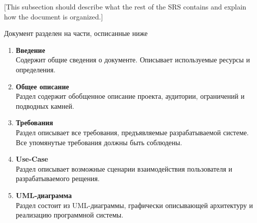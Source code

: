 [This subsection should describe what the rest 
of the SRS contains and explain how the document 
is organized.]

Документ разделен на части, осписанные ниже
\begin{enumerate}
    \item \textbf{Введение}\\
    Содержит общие сведения о документе. Описывает используемые ресурсы и определения.
    \item \textbf{Общее описание}\\
    Раздел содержит обобщенное описание проекта, аудитории, ограничений и подводных камней.
    \item \textbf{Требования}\\
    Раздел описывает все требования, предъявляемые разрабатываемой системе. Все упомянутые требования должны быть соблюдены.
    \item \textbf{Use-Case}\\
    Раздел описывает возможные сценарии взаимодействия пользователя и разрабатываемого рещения.
    \item \textbf{UML-диаграмма}\\
    Раздел состоит из UML-диаграммы, графически описывающей архитектуру и реализацию программной системы.
\end{enumerate}